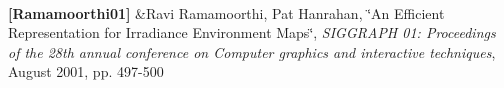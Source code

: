 \begin{longtabu}
\\
\label{specification__pbr_math_Ramamoorthi01}%
%
{\bfseries \mbox{[}Ramamoorthi01\mbox{]}} &Ravi Ramamoorthi, Pat Hanrahan, \char`\"{}\+An Efficient Representation for Irradiance Environment Maps\char`\"{}, {\itshape S\+I\+G\+G\+R\+A\+PH \textquotesingle{}01\+: Proceedings of the 28th annual conference on Computer graphics and interactive techniques}, August 2001, pp. 497-\/500 

\\
\end{longtabu}


